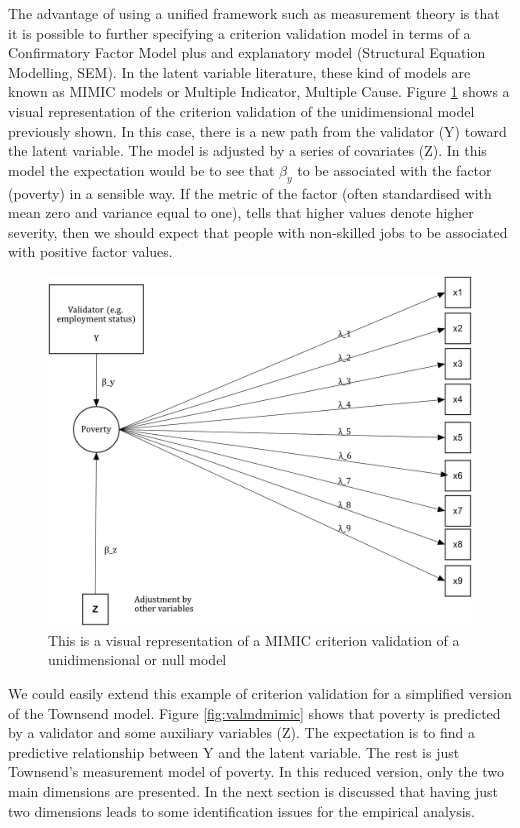 \documentclass[]{book}
\begin{document}
The advantage of using a unified framework such as measurement theory is that it is possible to further specifying a criterion validation model in terms of a Confirmatory Factor Model plus and explanatory model (Structural Equation Modelling, SEM). In the latent variable literature, these kind of models are known as MIMIC models or Multiple Indicator, Multiple Cause. Figure \ref{fig:valmimic} shows a visual representation of the criterion validation of the unidimensional model previously shown. In this case, there is a new path from the validator (Y) toward the latent variable. The model is adjusted by a series of covariates (Z). In this model the expectation would be to see that \(\beta_y\) to be associated with the factor (poverty) in a sensible way. If the metric of the factor (often standardised with mean zero and variance equal to one), tells that higher values denote higher severity, then we should expect that people with non-skilled jobs to be associated with positive factor values.

\begin{figure}[H]

{\centering \includegraphics[width=\textwidth]{val_MIMIC} 

}

\caption{This is a visual representation of a MIMIC criterion validation of a unidimensional or null model}\label{fig:valmimic}
\end{figure}

We could easily extend this example of criterion validation for a simplified version of the Townsend model. Figure \ref{fig:valmdmimic} shows that poverty is predicted by a validator and some auxiliary variables (Z). The expectation is to find a predictive relationship between Y and the latent variable. The rest is just Townsend's measurement model of poverty. In this reduced version, only the two main dimensions are presented. In the next section is discussed that having just two dimensions leads to some identification issues for the empirical analysis.
\end{document}

